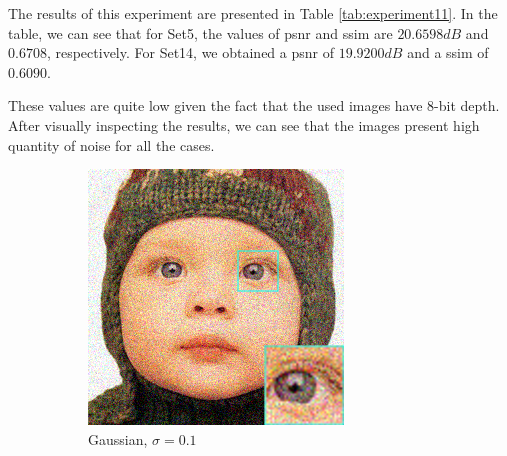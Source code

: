 The results of this experiment are presented in Table \ref{tab:experiment11}. In the table, we can see that for Set5, the values of \gls{psnr} and \gls{ssim} are $20.6598dB$ and $0.6708$, respectively. For Set14, we obtained a \gls{psnr} of $19.9200dB$ and a \gls{ssim} of $0.6090$.

These values are quite low given the fact that the used images have 8-bit depth. After visually inspecting the results, we can see that the images present high quantity of noise for all the cases.

\begin{figure}
	\centering
	\begin{subfigure}{0.24\textwidth}
		\includegraphics[width=\textwidth]{images/exp1.1/gaussian0.png}
		\caption{Gaussian, $\sigma=0.1$}
	\end{subfigure}
	\begin{subfigure}{0.24\textwidth}

\end{subfigure}
\end{figure}
